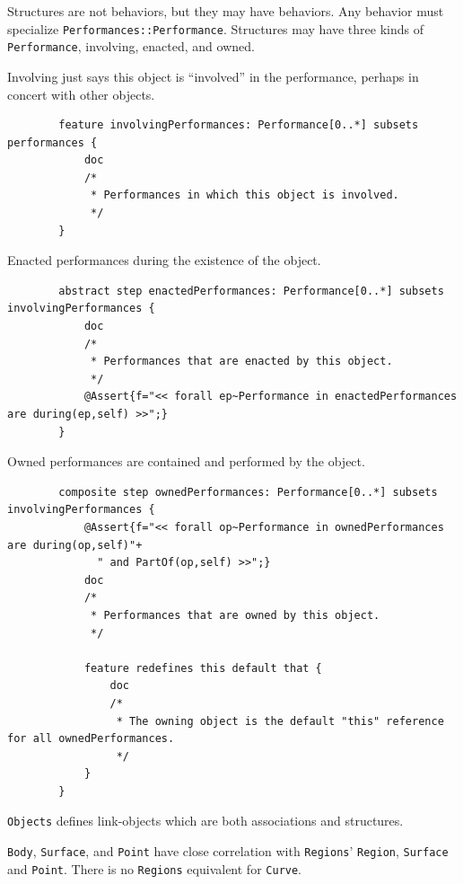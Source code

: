 \pn Structures are not behaviors, but they may have behaviors.  Any behavior must specialize \texttt{Performances::}\-\texttt{Performance}. 
Structures may have three kinds of \texttt{Performance},  involving, enacted, and owned.

\pn Involving just says this object is ``involved'' in the performance, perhaps in concert with other objects.
\begin{lstlisting}
		feature involvingPerformances: Performance[0..*] subsets performances {
			doc
			/*
			 * Performances in which this object is involved.
			 */
		}
\end{lstlisting}

\pn Enacted performances during the existence of the object.
\begin{lstlisting}
		abstract step enactedPerformances: Performance[0..*] subsets involvingPerformances {
			doc
			/*
			 * Performances that are enacted by this object.
			 */
			@Assert{f="<< forall ep~Performance in enactedPerformances are during(ep,self) >>";}
		}
\end{lstlisting}

\pn Owned performances are contained and performed by the object.
\label{ownedPerformances}
\begin{lstlisting}
		composite step ownedPerformances: Performance[0..*] subsets involvingPerformances {
			@Assert{f="<< forall op~Performance in ownedPerformances are during(op,self)"+
			  " and PartOf(op,self) >>";}
			doc
			/*
			 * Performances that are owned by this object.
			 */
			 
			feature redefines this default that {
				doc
				/*
				 * The owning object is the default "this" reference for all ownedPerformances.
				 */
			}
		}
\end{lstlisting}

\pn \texttt{Objects} defines link-objects which are both associations and structures.

\pn \texttt{Body}, \texttt{Surface}, and \texttt{Point} have close correlation with \texttt{Regions}' \texttt{Region}, \texttt{Surface} and \texttt{Point}.
There is no  \texttt{Regions} equivalent for  \texttt{Curve}.



